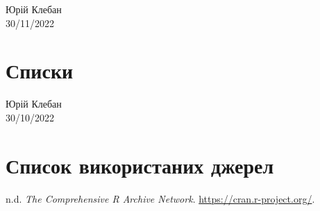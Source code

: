\documentclass[
  letterpaper,
  DIV=11,
  numbers=noendperiod]{scrreprt}
\newlength{\cslhangindent}
\newlength{\cslentryspacingunit} %
\newenvironment{CSLReferences}[2] %
 {%
  \setlength{\parindent}{0pt}
  \ifodd #1
  \let\oldpar\par
  \def\par{\hangindent=\cslhangindent\oldpar}
  \fi
  \setlength{\parskip}{#2\cslentryspacingunit}
 }%
 {}
\begin{document}
Юрій Клебан\\
30/11/2022

\hfill\break

\hypertarget{ux441ux43fux438ux441ux43aux438}{%
\chapter{Списки}\label{ux441ux43fux438ux441ux43aux438}}

Юрій Клебан\\
30/10/2022

\hfill\break


\hypertarget{ux441ux43fux438ux441ux43eux43a-ux432ux438ux43aux43eux440ux438ux441ux442ux430ux43dux438ux445-ux434ux436ux435ux440ux435ux43b}{%
\chapter*{Список використаних
джерел}\label{ux441ux43fux438ux441ux43eux43a-ux432ux438ux43aux43eux440ux438ux441ux442ux430ux43dux438ux445-ux434ux436ux435ux440ux435ux43b}}

\hypertarget{refs}{}
\begin{CSLReferences}{1}{0}
\leavevmode{}%
n.d. \emph{The Comprehensive R Archive Network}.
\url{https://cran.r-project.org/}.

\end{CSLReferences}
\end{document}
